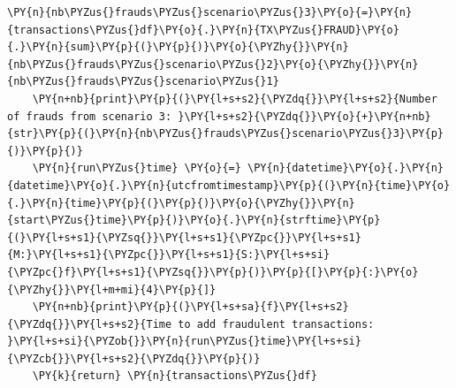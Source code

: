 \begin{tcolorbox}[breakable, size=fbox, boxrule=1pt, pad at break*=1mm,colback=cellbackground, colframe=cellborder]
\begin{Verbatim}[commandchars=\\\{\}]
    \PY{n}{nb\PYZus{}frauds\PYZus{}scenario\PYZus{}3}\PY{o}{=}\PY{n}{transactions\PYZus{}df}\PY{o}{.}\PY{n}{TX\PYZus{}FRAUD}\PY{o}{.}\PY{n}{sum}\PY{p}{(}\PY{p}{)}\PY{o}{\PYZhy{}}\PY{n}{nb\PYZus{}frauds\PYZus{}scenario\PYZus{}2}\PY{o}{\PYZhy{}}\PY{n}{nb\PYZus{}frauds\PYZus{}scenario\PYZus{}1}
    \PY{n+nb}{print}\PY{p}{(}\PY{l+s+s2}{\PYZdq{}}\PY{l+s+s2}{Number of frauds from scenario 3: }\PY{l+s+s2}{\PYZdq{}}\PY{o}{+}\PY{n+nb}{str}\PY{p}{(}\PY{n}{nb\PYZus{}frauds\PYZus{}scenario\PYZus{}3}\PY{p}{)}\PY{p}{)}
    \PY{n}{run\PYZus{}time} \PY{o}{=} \PY{n}{datetime}\PY{o}{.}\PY{n}{datetime}\PY{o}{.}\PY{n}{utcfromtimestamp}\PY{p}{(}\PY{n}{time}\PY{o}{.}\PY{n}{time}\PY{p}{(}\PY{p}{)}\PY{o}{\PYZhy{}}\PY{n}{start\PYZus{}time}\PY{p}{)}\PY{o}{.}\PY{n}{strftime}\PY{p}{(}\PY{l+s+s1}{\PYZsq{}}\PY{l+s+s1}{\PYZpc{}}\PY{l+s+s1}{M:}\PY{l+s+s1}{\PYZpc{}}\PY{l+s+s1}{S:}\PY{l+s+si}{\PYZpc{}f}\PY{l+s+s1}{\PYZsq{}}\PY{p}{)}\PY{p}{[}\PY{p}{:}\PY{o}{\PYZhy{}}\PY{l+m+mi}{4}\PY{p}{]}
    \PY{n+nb}{print}\PY{p}{(}\PY{l+s+sa}{f}\PY{l+s+s2}{\PYZdq{}}\PY{l+s+s2}{Time to add fraudulent transactions: }\PY{l+s+si}{\PYZob{}}\PY{n}{run\PYZus{}time}\PY{l+s+si}{\PYZcb{}}\PY{l+s+s2}{\PYZdq{}}\PY{p}{)}
    \PY{k}{return} \PY{n}{transactions\PYZus{}df}
\end{Verbatim}
\end{tcolorbox}

